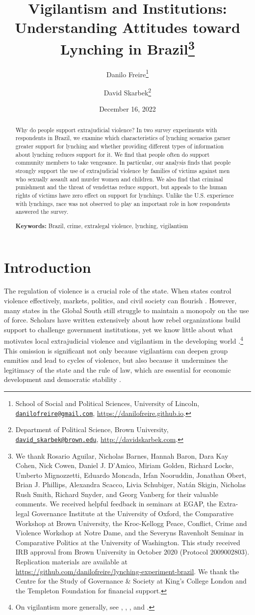 \documentclass[12pt,a4paper]{article}
\title{Vigilantism and Institutions:\\ Understanding Attitudes toward Lynching in Brazil\footnote{We thank Rosario Aguilar, Nicholas Barnes, Hannah Baron, Dara Kay Cohen, Nick Cowen, Daniel J. D'Amico, Miriam Golden, Richard Locke, Umberto Mignozzetti, Eduardo Moncada, Irfan Nooruddin, Jonathan Obert, Brian J. Phillips, Alexandra Scacco, Livia Schubiger, Natán Skigin, Nicholas Rush Smith, Richard Snyder, and Georg Vanberg for their valuable comments. We received helpful feedback in seminars at EGAP, the Extra-legal Governance Institute at the University of Oxford, the Comparative Workshop at Brown University, the Kroc-Kellogg Peace, Conflict, Crime and Violence Workshop at Notre Dame, and the Severyns Ravenholt Seminar in Comparative Politics at the University of Washington. This study received IRB approval from Brown University in October 2020 (Protocol 2009002803). Replication materials are available at \url{https://github.com/danilofreire/lynching-experiment-brazil}. We thank the Centre for the Study of Governance \& Society at King's College London and the Templeton Foundation for financial support.}}
\author{Danilo Freire\footnote{School of Social and Political Sciences, University of Lincoln, \href{mailto:danilofreire@gmail.com}{\texttt{danilofreire@gmail.com}}, \url{https://danilofreire.github.io}.} \and David Skarbek\footnote{Department of Political Science, Brown University, \href{mailto:david_skarbek@brown.edu}{\texttt{david\_skarbek@brown.edu}}, \url{http://davidskarbek.com}.}}
\date{December 16, 2022}
\begin{document}
\maketitle

\begin{abstract}
  \doublespacing \noindent Why do people support extrajudicial violence? In two survey experiments with respondents in Brazil, we examine which characteristics of lynching scenarios garner greater support for lynching and whether providing different types of information about lynching reduces support for it. We find that people often do support community members to take vengeance. In particular, our analysis finds that people strongly support the use of extrajudicial violence by families of victims against men who sexually assault and murder women and children. We also find that criminal punishment and the threat of vendettas reduce support, but appeals to the human rights of victims have zero effect on support for lynchings. Unlike the U.S. experience with lynchings, race was not observed to play an important role in how respondents answered the survey.
\vspace{.25cm}

\noindent \textbf{Keywords:} Brazil, crime, extralegal violence, lynching, vigilantism
\vspace{.25cm}

\end{abstract}

\newpage

\section*{Introduction}
\label{sec:introduction}

\doublespacing

The regulation of violence is a crucial role of the state. When states control
violence effectively, markets, politics, and civil society can flourish
\citep{besley2011pillars, north2009violence}. However, many states in the
Global South still struggle to maintain a monopoly on the use of force.
Scholars have written extensively about how rebel organizations build support
to challenge government institutions, yet we know little about what motivates
local extrajudicial violence and vigilantism in the developing world
\citep{bateson2020politics}.\footnote{On vigilantism more generally, see
\citet{cohen2022collective}, \citet{schuberth2013challenging},
\citet{smith2019contradictions}, and \citet{zizumbo2017community}.} This
omission is significant not only because vigilantism can deepen group enmities
and lead to cycles of violence, but also because it undermines the legitimacy
of the state and the rule of law, which are essential for economic development
and democratic stability \citep{jung2020lynching, tankebe2009self}.
\end{document}
